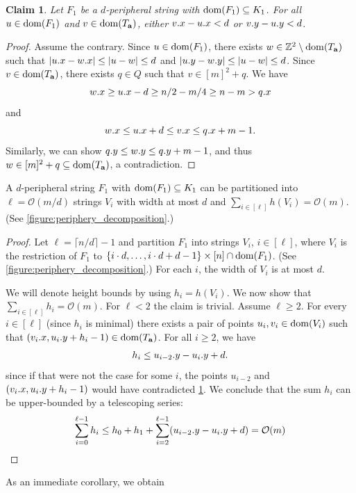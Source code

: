 \documentclass[twoside,leqno]{article}
\newtheorem{claim}{Claim}[section]
\newcommand{\Z}{\mathbb{Z}}
\renewcommand{\O}{\mathcal{O}}
\newcommand{\Ta}{T_\mathbf{a}}
\newcommand{\set}[1]{\left\lbrace #1 \right\rbrace}
\newcommand{\absolute}[1]{\left\lvert#1\right\rvert}
\begin{document}
\begin{claim}\label{border_lemma}
Let $F_1$ be a $d$-peripheral string with $\operatorname*{dom}(F_1) \subseteq K_1$. For all $u \in \operatorname*{dom}(F_1)$ and ${v \in \d{\Ta}}$, either $v.x - u.x < d$ or $v.y - u.y < d$.  
\end{claim}
\begin{proof}
Assume the contrary. Since $u \in \operatorname*{dom}(F_1)$, there exists $w \in \Z^2 \setminus \d{\Ta}$ such that $\absolute{\x{u} - \x{w}} \le \absolute{u-w} \le d$ and $\absolute{\y{u} - \y{w}} \le \absolute{u-w} \le d$. Since $v \in \d{\Ta}$, there exists $q \in Q$ such that $v \in [m]^2 + q$. We have
\[ w.x \ge u.x - d \ge n/2 - m/4 \ge n - m > q.x\]
and
\[ w.x \le u.x + d \le v.x \le q.x + m - 1. \]
Similarly, we can show $q.y \le w.y \le q.y + m - 1$, and thus $w \in [m]^2 + q \subseteq \d{\Ta}$, a contradiction.
\end{proof}

\begin{lemma}\label{lm:partitioning}
A $d$-peripheral string $F_1$ with $\operatorname*{dom}(F_1) \subseteq K_1$ can be partitioned into $\ell = \O(m/d)$ strings $V_i$ with width at most $d$ and $\sum_{i \in [\ell]} h(V_i) = \O(m)$. (See \cref{figure:periphery_decomposition}.)
\end{lemma}
\begin{proof}
Let $\ell = \lceil n / d \rceil - 1$ and partition $F_1$ into strings $V_i$, $i \in [\ell]$, where $V_i$ is the restriction of $F_1$ to $\set{i \cdot d, \dots, i \cdot d + d - 1} \times [n] \cap \d{F_1}$. (See \cref{figure:periphery_decomposition}.) 
For each $i$, the width of $V_i$ is at most $d$. 

We will denote height bounds by using $h_i = h(V_i)$. We now show that $\sum_{i \in [\ell]} h_i = \O(m)$. For $\ell < 2$ the claim is trivial. Assume $\ell \ge 2$. For every $i \in [\ell]$ (since $h_i$ is minimal) there exists a pair of points $u_i, v_i \in \operatorname*{dom}(V_i)$ such that $(\x{v_i}, \y{u_i} + h_i - 1) \in \d{\Ta}$. For all $i \ge 2$, we have
\[ h_i \le u_{i - 2}.y - u_{i}.y + d.\]
since if that were not the case for some $i$, the points $u_{i - 2}$ and $(v_{i}.x, u_{i}.y + h_i - 1)$ would have contradicted \cref{border_lemma}. We conclude that the sum $h_i$ can be upper-bounded by a telescoping series:
%
$$\sum_{i = 0}^{\ell - 1} h_i \le h_0 + h_1 + \sum_{i = 2}^{\ell - 1} (\y{u_{i - 2}} - \y{u_i} + d) = \O(m)$$
\end{proof}

As an immediate corollary, we obtain
\end{document}
